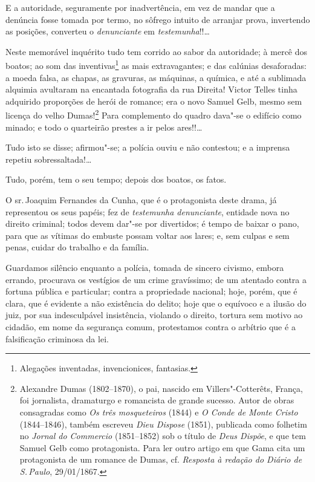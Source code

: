 E a autoridade, seguramente por inadvertência, em vez de mandar que a
denúncia fosse tomada por termo, no sôfrego intuito de arranjar prova,
invertendo as posições, converteu o \emph{denunciante} em
\emph{testemunha}!!\ldots{}

Neste memorável inquérito tudo tem corrido ao sabor da autoridade; à
mercê dos boatos; ao som das inventivas\footnote{Alegações inventadas,
  invencionices, fantasias.} as mais extravagantes; e das calúnias
desaforadas: a moeda falsa, as chapas, as gravuras, as máquinas, a
química, e até a sublimada alquimia avultaram na encantada fotografia da
rua Direita! Victor Telles tinha adquirido proporções de herói de
romance; era o novo Samuel Gelb, mesmo sem licença do velho
Dumas!\footnote{Alexandre Dumas (1802--1870), o pai, nascido em
  Villers"-Cotterêts, França, foi jornalista, dramaturgo e romancista de
  grande sucesso. Autor de obras consagradas como \emph{Os três
  mosqueteiros} (1844) e \emph{O Conde de Monte Cristo} (1844--1846),
  também escreveu \emph{Dieu Dispose} (1851), publicada como folhetim no
  \emph{Jornal do Commercio} (1851--1852) sob o título de \emph{Deus
  Dispõe}, e que tem Samuel Gelb como protagonista. Para ler outro
  artigo em que Gama cita um protagonista de um romance de Dumas, cf.
  \emph{Resposta à redação do Diário de S.\,Paulo}, 29/01/1867.}
Para complemento do quadro
dava"-se o edifício como minado; e todo o quarteirão prestes a ir pelos
ares!!\ldots{}

Tudo isto se disse; afirmou"-se; a polícia ouviu e não contestou; e a
imprensa repetiu sobressaltada!\ldots{}

Tudo, porém, tem o seu tempo; depois dos boatos, os fatos.

O sr.\,Joaquim Fernandes da Cunha, que é o protagonista deste drama, já
representou os seus papéis; fez de \emph{testemunha denunciante},
entidade nova no direito criminal; todos devem dar"-se por divertidos; é
tempo de baixar o pano, para que as vítimas do embuste possam voltar aos
lares; e, sem culpas e sem penas, cuidar do trabalho e da família.

Guardamos silêncio enquanto a polícia, tomada de sincero civismo, embora
errando, procurava os vestígios de um crime gravíssimo; de um atentado
contra a fortuna pública e particular; contra a propriedade nacional;
hoje, porém, que é clara, que é evidente a não existência do delito;
hoje que o equívoco e a ilusão do juiz, por sua indesculpável
insistência, violando o direito, tortura sem motivo ao cidadão, em nome
da segurança comum, protestamos contra o arbítrio que é a falsificação
criminosa da lei.

